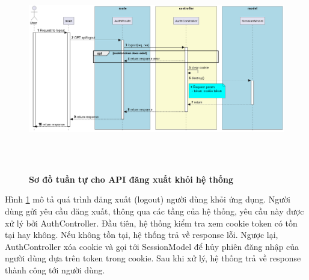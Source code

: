 \begin{figure}[H]
  \centering
  \includegraphics[width=16cm,height=9cm]{Images/server/sequence/server/logout.png}
  \caption[Sơ đồ tuần tự cho API đăng xuất khỏi hệ thống ]{\bfseries \fontsize{12pt}{0pt}
  \selectfont Sơ đồ tuần tự cho API đăng xuất khỏi hệ thống }
  \label{backend_logout} %
\end{figure}
Hình \ref{backend_logout} mô tả quá trình đăng xuất (logout) người dùng khỏi ứng dụng. Người dùng gửi yêu cầu đăng xuất, thông qua các tầng của hệ thống, yêu cầu này được xử lý bởi AuthController. Đầu tiên, hệ thống kiểm tra xem cookie token có tồn tại hay không. Nếu không tồn tại, hệ thống trả về response lỗi. Ngược lại, AuthController xóa cookie và gọi tới SessionModel để hủy phiên đăng nhập của người dùng dựa trên token trong cookie. Sau khi xử lý, hệ thống trả về response thành công tới người dùng.

